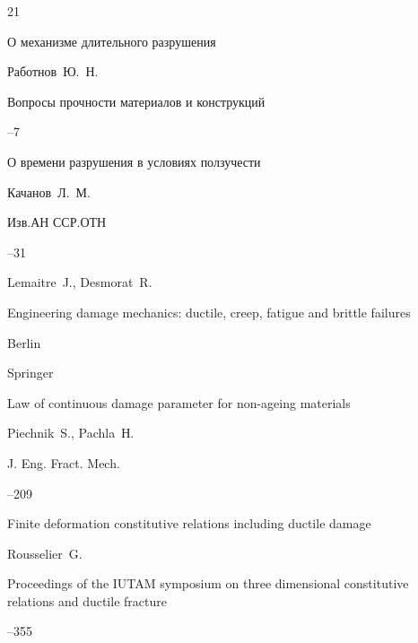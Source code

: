 \RusRef

\begin{thebibliography}{21}




\paper О механизме длительного разрушения

\by Работнов~Ю.~Н.

\jour Вопросы прочности материалов и конструкций


--7




\paper О времени разрушения в условиях ползучести

\by Качанов~Л.~М.

\jour Изв.АН ССР.ОТН


--31




\by Lemaitre~J., Desmorat~R.

\book Engineering damage mechanics: ductile, creep, fatigue and brittle failures

\publaddr Berlin

\publ Springer






\paper Law of continuous damage parameter for non-ageing materials

\by Piechnik~S., Pachla~Н.

\jour J. Eng. Fract. Mech.



--209




\paper Finite deformation constitutive relations including ductile damage

\by Rousselier~G.

\jour Proceedings of the IUTAM symposium on three dimensional constitutive relations and ductile fracture


--355




\end{thebibliography}
